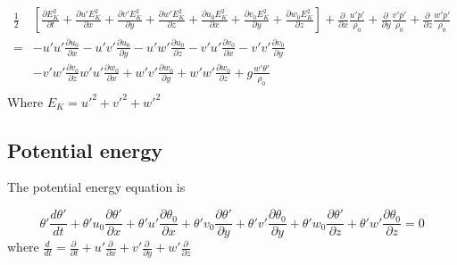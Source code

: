 \documentclass[a4paper,10pt]{article}
\newcommand{\fd}[2]{\frac{d#1}{d#2}}
\newcommand{\pd}[2]{\frac{\partial #1}{\partial #2}}
\newcommand{\Ddtf}[4]{\pd{#1}{t} + #2\pd{#1}{x} + #3\pd{#1}{y} + #4\pd{#1}{z}}
\newcommand{\fluxf}[4]{\pd{#1}{t} + \pd{#2#1}{x} + \pd{#3#1}{y} + \pd{#4#1}{z}}
\begin{document}
% 
\begin{equation}
  \begin{split}
    \frac{1}{2}&\left[\fluxf{E_K^2}{u'}{v'}{w'} + \pd{u_0 E_K^2}{x} + \pd{v_0 E_K^2}{y} + \pd{w_0 E_K^2}{z}\right] + \pd{\,}{x}\frac{u'p'}{\rho_0} + \pd{\,}{y}\frac{v'p'}{\rho_0} +\pd{\,}{z}\frac{w'p'}{\rho_0} \\  
	=  & - u'u'\pd{u_0}{x} -   u'v'\pd{u_0}{y}  - u'w'\pd{u_0}{z} - v'u'\pd{v_0}{x} - v'v'\pd{v_0}{y}  \\ & - v'w'\pd{v_0}{z} w'u'\pd{w_0}{x} +  w'v'\pd{w_0}{y}  + w'w'\pd{w_0}{z} + g\frac{w'\theta'}{\rho_0}\\
  \end{split}
  \label{eqn:kinet2}
\end{equation}
Where $E_K = u'^2+v'^2+w'^2$ 


\subsection{Potential energy}

The potential energy equation is 

\begin{equation}
  \theta'\fd{\theta'}{t} + \theta'u_0\pd{\theta'}{x} + \theta'u'\pd{\theta_0}{x} + \theta'v_0\pd{\theta'}{y} + \theta'v'\pd{\theta_0}{y} + \theta'w_0\pd{\theta'}{z} + \theta'w'\pd{\theta_0}{z} = 0
  \label{eqn:basicthe}
\end{equation}
where $\fd{\,}{t} = \Ddtf{\,}{u'}{v'}{w'}$
\end{document}
